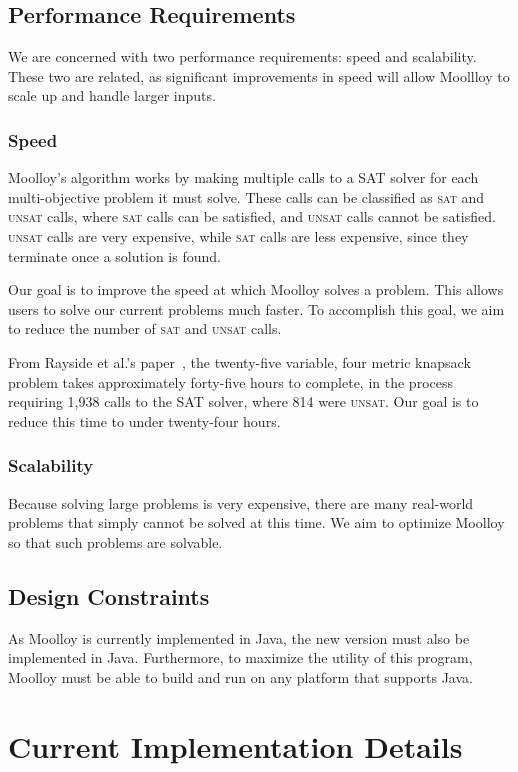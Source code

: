 \documentclass[11pt]{article}
\theoremstyle{definition}
\begin{document}
\subsection{Performance Requirements}\label{sec:perf_req}

We are concerned with two performance requirements: speed and
scalability. These two are related, as significant improvements in
speed will allow Moollloy to scale up and handle larger inputs.

\subsubsection{Speed}\label{sec:perf_speed}

Moolloy's algorithm works by making multiple calls to a SAT solver for
each multi-objective problem it must solve. These calls can be
classified as \textsc{sat} and \textsc{unsat} calls, where \textsc{sat}
calls can be satisfied, and \textsc{unsat} calls cannot be satisfied.
\textsc{unsat} calls are very expensive, while \textsc{sat} calls are
less expensive, since they terminate once a solution is found.

Our goal is to improve the speed at which Moolloy solves a problem.
This allows users to solve our current problems much faster. To
accomplish this goal, we aim to reduce the number of \textsc{sat} and
\textsc{unsat} calls.

From Rayside et al.'s paper~\cite{ref:Rayside09}, the twenty-five
variable, four metric knapsack problem takes approximately forty-five
hours to complete, in the process requiring 1,938 calls to the SAT
solver, where 814 were \textsc{unsat}. Our goal is to reduce this time
to under twenty-four hours.

\subsubsection{Scalability}\label{sec:perf_scale}

Because solving large problems is very expensive, there are many
real-world problems that simply cannot be solved at this time. We aim
to optimize Moolloy so that such problems are solvable.

\subsection{Design Constraints}\label{sec:constraints}

As Moolloy is currently implemented in Java, the new version must also
be implemented in Java. Furthermore, to maximize the utility of this
program, Moolloy must be able to build and run on any platform that
supports Java.

\section{Current Implementation Details}\label{sec:impl}


\printbibliography
\end{document}
